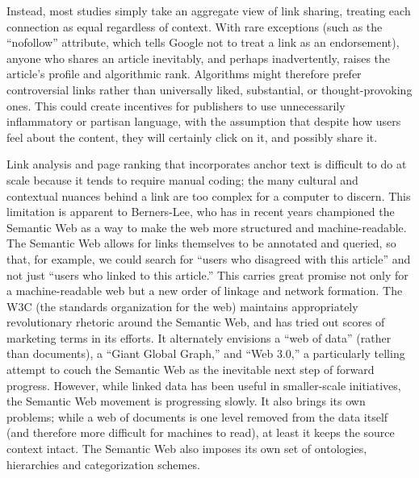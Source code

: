 Instead, most studies simply take an aggregate view of link sharing, treating each connection as equal regardless of context. With rare exceptions (such as the ``nofollow'' attribute, which tells Google not to treat a link as an endorsement), anyone who shares an article inevitably, and perhaps inadvertently, raises the article's profile and algorithmic rank. Algorithms might therefore prefer controversial links rather than universally liked, substantial, or thought-provoking ones. This could create incentives for publishers to use unnecessarily inflammatory or partisan language, with the assumption that despite how users feel about the content, they will certainly click on it, and possibly share it.

Link analysis and page ranking that incorporates anchor text is difficult to do at scale because it tends to require manual coding; the many cultural and contextual nuances behind a link are too complex for a computer to discern. This limitation is apparent to Berners-Lee, who has in recent years championed the Semantic Web as a way to make the web more structured and machine-readable. The Semantic Web allows for links themselves to be annotated and queried, so that, for example, we could search for ``users who disagreed with this article'' and not just ``users who linked to this article.''\autocite[FIND PAGE]{berners-lee_weaving_2000} This carries great promise not only for a machine-readable web but a new order of linkage and network formation. The W3C (the standards organization for the web) maintains appropriately revolutionary rhetoric around the Semantic Web, and has tried out scores of marketing terms in its efforts. It alternately envisions a ``web of data'' (rather than documents), a ``Giant Global Graph,'' and ``Web 3.0,'' a particularly telling attempt to couch the Semantic Web as the inevitable next step of forward progress. However, while linked data has been useful in smaller-scale initiatives, the Semantic Web movement is progressing slowly. It also brings its own problems; while a web of documents is one level removed from the data itself (and therefore more difficult for machines to read), at least it keeps the source context intact. The Semantic Web also imposes its own set of ontologies, hierarchies and categorization schemes.

